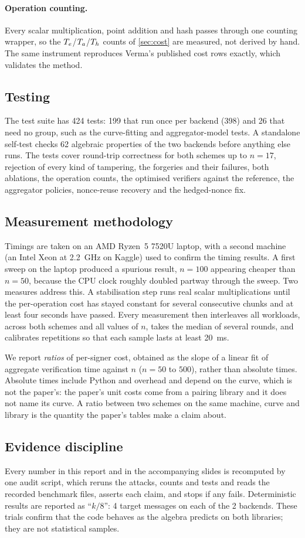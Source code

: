 \paragraph{Operation counting.}
Every scalar multiplication, point addition and hash passes through one counting wrapper, so the
$T_{e}$/$T_{a}$/$T_{h}$ counts of \cref{sec:cost} are measured, not derived by hand. The same instrument
reproduces Verma's published cost rows exactly, which validates the method.

\subsection{Testing}
The test suite has 424 tests: 199 that run once per backend (398) and 26 that need no group, such as the
curve-fitting and aggregator-model tests. A standalone self-test checks 62 algebraic properties of the two
backends before anything else runs. The tests cover round-trip correctness for both schemes up to
$n=17$, rejection of every kind of tampering, the forgeries and their failures, both ablations, the
operation counts, the optimised verifiers against the reference, the aggregator policies, nonce-reuse
recovery and the hedged-nonce fix.

\subsection{Measurement methodology}
Timings are taken on an AMD Ryzen~5 7520U laptop, with a second machine (an Intel Xeon at 2.2~GHz on
Kaggle) used to confirm the timing results. A first sweep on the laptop produced a spurious result,
$n=100$ appearing cheaper than $n=50$, because the CPU clock roughly doubled partway through the sweep.
Two measures address this. A stabilisation step runs real scalar multiplications until the per-operation
cost has stayed constant for several consecutive chunks and at least four seconds have passed. Every
measurement then interleaves all workloads, across both schemes and all values of $n$, takes the median
of several rounds, and calibrates repetitions so that each sample lasts at least 20~ms.

We report \emph{ratios} of per-signer cost, obtained as the slope of a linear fit of aggregate
verification time against $n$ ($n=50$ to $500$), rather than absolute times. Absolute times include Python
and  overhead and depend on the curve, which is not the paper's: the paper's unit costs come
from a pairing library and it does not name its curve. A ratio between two schemes on the same machine,
curve and library is the quantity the paper's tables make a claim about.

\subsection{Evidence discipline}
Every number in this report and in the accompanying slides is recomputed by one audit script, which
reruns the attacks, counts and tests and reads the recorded benchmark files, asserts each claim, and
stops if any fails. Deterministic results are reported as ``$k/8$'': 4 target messages on each of the 2
backends. These trials confirm that the code behaves as the algebra predicts on both libraries; they are
not statistical samples.
